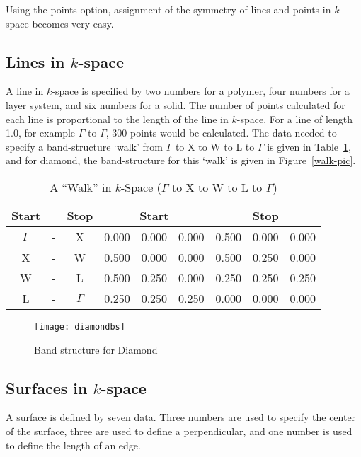 Using the points option, assignment of the symmetry of lines and points in
$k$-space becomes very easy.

\subsection{Lines in $k$-space}

A line  in $k$-space is specified by two numbers for a polymer, four numbers
for a layer system, and six numbers for a solid.  The number of points
calculated for each line is proportional to the length of the line in
$k$-space. For a line of length 1.0, for example $\Gamma$ to $\Gamma$, 300
points would be calculated.  The data needed to specify a
band-structure `walk' from $\Gamma $ to X to  W to L to $\Gamma $ is given in
Table~\ref{walk}, and for diamond, the band-structure for this `walk' is given
in Figure~\ref{walk-pic}.

\begin{table}
\begin{center}
\caption{\label{walk}A ``Walk'' in $k$-Space ($\Gamma $ to X to W to L to $\Gamma $)}
\begin{tabular}{ccccccccc} \\ \hline
Start && Stop&\multicolumn{3}{c}{Start} & \multicolumn{3}{c}{Stop} \\ \hline
$\Gamma$&-&X & 0.000& 0.000& 0.000& 0.500& 0.000& 0.000  \\
X       &-&W        & 0.500& 0.000& 0.000& 0.500& 0.250& 0.000  \\
W       &-&L        & 0.500& 0.250& 0.000& 0.250& 0.250& 0.250  \\
L       &-&$\Gamma$ & 0.250& 0.250& 0.250& 0.000& 0.000& 0.000  \\ \hline
\end{tabular}
\end{center}
\end{table}
\begin{figure}
\begin{makeimage}
\end{makeimage}
\begin{center}
\texttt{[image: diamondbs]}
\end{center}
\caption{\label{walk-pic}Band structure for Diamond}
\label{pbt}
\end{figure}


\subsection{Surfaces in $k$-space}
 A surface is
defined by seven data.  Three numbers are used to specify the center of the
surface, three are used to define a perpendicular, and one number is used to
define the length of an edge.

